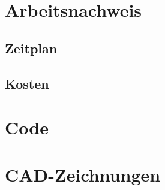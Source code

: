 \appendix
\chapter{Arbeitsnachweis}

\section{Zeitplan}

\section{Kosten}

\chapter{Code}

\chapter{CAD-Zeichnungen}
